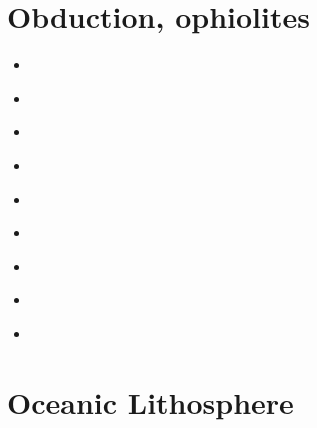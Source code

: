 \section{Obduction, ophiolites}
 

\begin{scriptsize}
\begin{itemize}
\item[\nineteenninety] 
\textcite{hack90} \\
\item[\nineteenninetyone] 
\textcite{hack91} \\
\item[\nineteenninetyseven] 
\textcite{rabh97} \\
\item[\twothousand] 
\textcite{mokd00} \\
\item[\twothousandfourteen] 
\textcite{agzf14} \\
\item[\twothousandsixteen] 
\textcite{duay16} \\
\item[\twothousandtwenty] 
\textcite{rohb20} \\
\item[\twothousandtwentyone] 
\textcite{pody21} \\
\item[\twothousandtwentytwo] 
\textcite{zhli22} 
\end{itemize}
\end{scriptsize}

\section{Oceanic Lithosphere}

